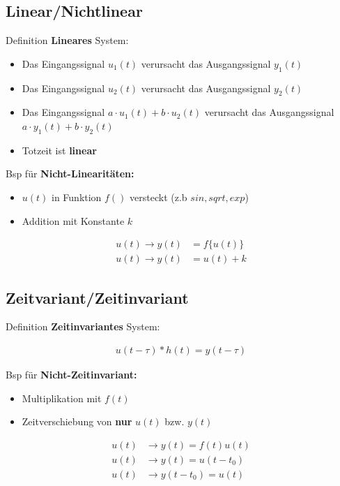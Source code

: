 \documentclass[10pt,a4paper]{article}
\begin{document}
  \subsection{Linear/Nichtlinear}
  Definition \textbf{Lineares} System:
  \begin{itemize}
      \item Das Eingangssignal $u_1(t)$ verursacht das Ausgangssignal $y_1(t)$
      \item Das Eingangssignal $u_2(t)$ verursacht das Ausgangssignal $y_2(t)$
      \item Das Eingangssignal $a\cdot u_1(t) + b\cdot u_2(t)$ verursacht das Ausgangssignal $a\cdot y_1(t) + b\cdot y_2(t)$
      \item Totzeit ist \textbf{linear}
  \end{itemize}
  Bsp für \textbf{Nicht-Linearitäten:}
  \begin{itemize}
      \item $u(t)$ in Funktion $f()$ versteckt (z.b $sin, sqrt, exp$)
      \item Addition mit Konstante $k$
  \end{itemize}
  
  \begin{mdframed}[style=exercise]
    \begin{align}
        u(t)\rightarrow y(t) &= f\{u(t)\} \\
        u(t)\rightarrow y(t) &= u(t) + k
    \end{align}
  \end{mdframed}

  \subsection{Zeitvariant/Zeitinvariant}
  Definition \textbf{Zeitinvariantes} System:
  \begin{mdframed}[style=exercise]
    \begin{align}
        u(t-\tau) * h(t) = y(t-\tau)
    \end{align}
  \end{mdframed}
  Bsp für \textbf{Nicht-Zeitinvariant:}
  \begin{itemize}
    \item Multiplikation mit $f(t)$
    \item Zeitverschiebung von \textbf{nur} $u(t)$ bzw. $y(t)$
  \end{itemize}
  \begin{mdframed}[style=exercise]
    \begin{align}
        u(t) &\rightarrow y(t) = f(t)u(t)\\
        u(t) &\rightarrow y(t) = u(t-t_0)\\
        u(t) &\rightarrow y(t-t_0) = u(t)
    \end{align}
  \end{mdframed}
\end{document}
